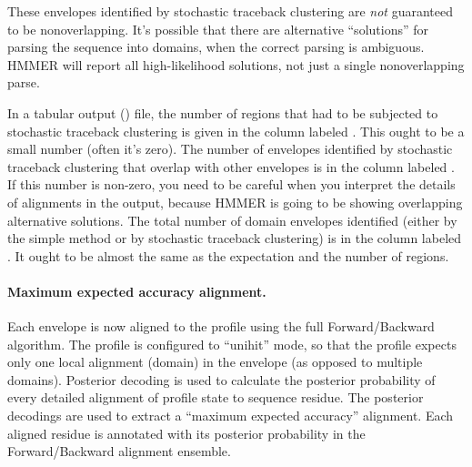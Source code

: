 These envelopes identified by stochastic traceback clustering are
\emph{not} guaranteed to be nonoverlapping. It's possible that there
are alternative ``solutions'' for parsing the sequence into domains,
when the correct parsing is ambiguous. HMMER will report all
high-likelihood solutions, not just a single nonoverlapping parse.

In a tabular output () file, the number of regions
that had to be subjected to stochastic traceback clustering is given
in the column labeled . This ought to be a small number
(often it's zero). The number of envelopes identified by stochastic
traceback clustering that overlap with other envelopes is in the
column labeled . If this number is non-zero, you need to be
careful when you interpret the details of alignments in the output,
because HMMER is going to be showing overlapping alternative
solutions. The total number of domain envelopes identified (either by
the simple method or by stochastic traceback clustering) is in the
column labeled . It ought to be almost the same as the
expectation and the number of regions.

\paragraph{Maximum expected accuracy alignment.}
Each envelope is now aligned to the profile using the full
Forward/Backward algorithm. The profile is configured to ``unihit''
mode, so that the profile expects only one local alignment (domain) in
the envelope (as opposed to multiple domains).  Posterior decoding is
used to calculate the posterior probability of every detailed
alignment of profile state to sequence residue. The posterior
decodings are used to extract a ``maximum expected accuracy''
alignment. Each aligned residue is annotated with its posterior
probability in the Forward/Backward alignment ensemble.

